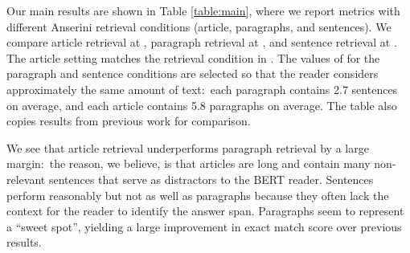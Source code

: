 \documentclass[11pt,a4paper]{article}
\begin{document}
Our main results are shown in Table \ref{table:main}, where we report metrics with different Anserini retrieval conditions (article, paragraphs, and sentences).
We compare article retrieval at , paragraph retrieval at , and sentence retrieval at .
The article setting matches the retrieval condition in \citet{P17-1171}.
The values of  for the paragraph and sentence conditions are selected so that the reader considers approximately the same amount of text:\ each paragraph contains 2.7 sentences on average, and each article contains 5.8 paragraphs on average.
The table also copies results from previous work for comparison.

We see that article retrieval underperforms paragraph retrieval by a large margin:\ the reason, we believe, is that articles are long and contain many non-relevant sentences that serve as distractors to the BERT reader.
Sentences perform reasonably but not as well as paragraphs because they often lack the context for the reader to identify the answer span.
Paragraphs seem to represent a ``sweet spot'', yielding a large improvement in exact match score over previous results.
\end{document}
